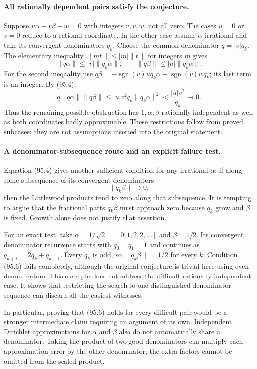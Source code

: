 \documentclass[11pt]{article}
\begin{document}
\paragraph{All rationally dependent pairs satisfy the conjecture.}
Suppose $u\alpha+v\beta+w=0$ with integers $u,v,w$, not all zero.
The cases $u=0$ or $v=0$ reduce to a rational coordinate. In the other
case assume $\alpha$ irrational and take its convergent denominators $q_k$.
Choose the common denominator $q=|v|q_k$. The elementary inequality
$\|m t\|\leq|m|\|t\|$ for integers $m$ gives
\[
 \|q\alpha\|\leq|v|\|q_k\alpha\|,
 \qquad \|q\beta\|\leq|u|\|q_k\alpha\|.
\]
For the second inequality use
$q\beta=-\operatorname{sgn}(v)u q_k\alpha
          -\operatorname{sgn}(v)w q_k$; its last term is an integer.
By (95.4),
\[
 q\|q\alpha\|\|q\beta\|
 \leq|u|v^2q_k\|q_k\alpha\|^2
 <\frac{|u|v^2}{q_k}\longrightarrow0.                  \tag{95.5}
\]
Thus the remaining possible obstruction has $1,\alpha,\beta$ rationally
independent as well as both coordinates badly approximable. These
restrictions follow from proved subcases; they are not assumptions
inserted into the original statement.

\paragraph{A denominator-subsequence route and an explicit failure test.}
Equation (95.4) gives another sufficient condition for any irrational
$\alpha$: if along some subsequence of its convergent denominators
\[
                              \|q_k\beta\|\to0,         \tag{95.6}
\]
then the Littlewood products tend to zero along that subsequence. It is
tempting to argue that the fractional parts $q_k\beta$ must approach zero
because $q_k$ grow and $\beta$ is fixed. Growth alone does not justify
that assertion.

For an exact test, take $\alpha=1/\sqrt2=[0;1,2,2,\ldots]$ and
$\beta=1/2$. Its convergent denominator recurrence starts with
$q_0=q_1=1$ and continues as $q_{k+1}=2q_k+q_{k-1}$. Every $q_k$ is odd,
so $\|q_k\beta\|=1/2$ for every $k$. Condition (95.6) fails completely,
although the original conjecture is trivial here using even denominators.
This example does not address the difficult rationally independent case.
It shows that restricting the search to one distinguished denominator
sequence can discard all the easiest witnesses.

In particular, proving that (95.6) holds for every difficult pair would
be a stronger intermediate claim requiring an argument of its own.
Independent Dirichlet approximations for $\alpha$ and $\beta$ also do
not automatically share a denominator. Taking the product of two good
denominators can multiply each approximation error by the other
denominator; the extra factors cannot be omitted from the scaled product.
\end{document}
